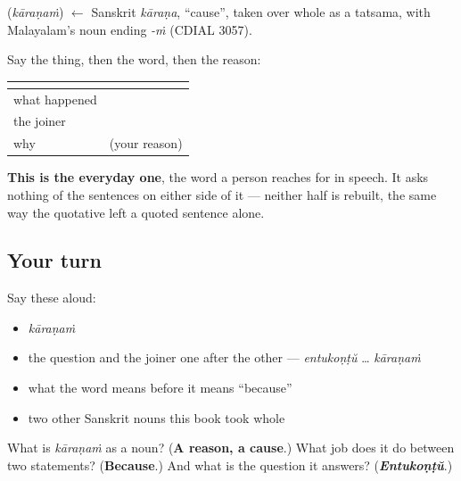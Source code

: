 \begin{cousinweb}
\textbf{} (\emph{kāraṇaṁ}) $\leftarrow$ Sanskrit \emph{kāraṇa}, \textquotedblleft{}cause\textquotedblright{}, taken over whole as a tatsama, with Malayalam's noun ending \emph{-ṁ} (CDIAL 3057).
\end{cousinweb}

\begin{grammarlens}[title={Grammar Lens: it sits between the two halves}]
Say the thing, then the word, then the reason:

\noindent
\begin{tabularx}{\linewidth}{@{}>{\raggedright\arraybackslash}X>{\raggedright\arraybackslash}X@{}}
\toprule
\textbf{} & \textbf{} \\
\midrule
what happened & \textbf{\ml{എനിക്ക്} \ml{മലയാളം} \ml{ഇഷ്ടം}} \\
the joiner & \textbf{\ml{കാരണം}} \\
why & (your reason) \\
\bottomrule
\end{tabularx}

\textbf{This is the everyday one}, the word a person reaches for in speech. It asks nothing of the sentences on either side of it — neither half is rebuilt, the same way the quotative left a quoted sentence alone.
\end{grammarlens}

\subsection*{Your turn}
Say these aloud:

\begin{itemize}
\raggedright
  \item \emph{kāraṇaṁ}
  \item the question and the joiner one after the other — \emph{entukoṇṭŭ} … \emph{kāraṇaṁ}
  \item what the word means before it means \textquotedblleft{}because\textquotedblright{}
  \item two other Sanskrit nouns this book took whole
\end{itemize}

\begin{tcolorbox}[breakable,colback=teal!4,colframe=teal!35!black,title={Before you move on}]
What is \emph{kāraṇaṁ} as a noun? (\textbf{A reason, a cause}.) What job does it do between two statements? (\textbf{Because}.) And what is the question it answers? (\emph{\textbf{Entukoṇṭŭ}}.)
\end{tcolorbox}
